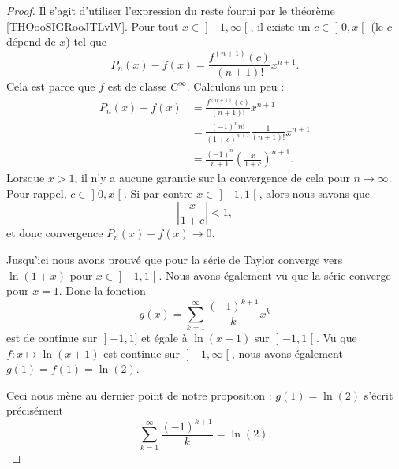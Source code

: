 \begin{proof}
	Il s'agit d'utiliser l'expression du reste fourni par le théorème \ref{THOooSIGRooJTLvlV}. Pour tout \( x\in \mathopen] -1 , \infty \mathclose[\), il existe un \( c\in\mathopen] 0 , x \mathclose[\) (le \( c\) dépend de \( x\)) tel que
		\begin{equation}
			P_n(x)-f(x)=\frac{ f^{(n+1)}(c) }{ (n+1)! }x^{n+1}.
		\end{equation}
		Cela est parce que \( f\) est de classe \(  C^{\infty}\). Calculons un peu :
		\begin{subequations}
			\begin{align}
				P_n(x)-f(x) & =\frac{ f^{(n+1)}(c) }{ (n+1)! }x^{n+1}                        \\
				            & =\frac{ (-1)^nn! }{ (1+c)^{n+1} }\frac{1}{ (n+1)! }x^{n+1}     \\
				            & =\frac{ (-1)^n }{ n+1 }\left( \frac{ x }{ 1+c } \right)^{n+1}.
			\end{align}
		\end{subequations}
		Lorsque \( x>1\), il n'y a aucune garantie sur la convergence de cela pour \( n\to \infty\). Pour rappel, \( c\in\mathopen] 0 , x \mathclose[\). Si par contre \( x\in\mathopen] -1 , 1 \mathclose[\), alors nous savons que
		\begin{equation}
			\left| \frac{ x }{ 1+c } \right| <1,
		\end{equation}
		et donc convergence \( P_n(x)-f(x)\to 0\).

		Jusqu'ici nous avons prouvé que pour la série de Taylor converge vers \( \ln(1+x)\) pour \( x\in \mathopen] -1 , 1 \mathclose[\). Nous avons également vu que la série converge pour \( x=1\). Donc la fonction
		\begin{equation}
			g(x)=\sum_{k=1}^{\infty}\frac{ (-1)^{k+1} }{ k }x^k
		\end{equation}
		est de continue sur \( \mathopen] -1 , 1 \mathclose]\) et égale à \( \ln(x+1)\) sur \( \mathopen] -1 , 1 \mathclose[\). Vu que \( f\colon x\mapsto \ln(x+1)\) est continue sur \( \mathopen] -1 , \infty \mathclose[\), nous avons également \( g(1)=f(1)=\ln(2)\).

	Ceci nous mène au dernier point de notre proposition : \( g(1)=\ln(2)\) s'écrit précisément
	\begin{equation}
		\sum_{k=1}^{\infty}\frac{ (-1)^{k+1} }{ k }=\ln(2).
	\end{equation}
\end{proof}

